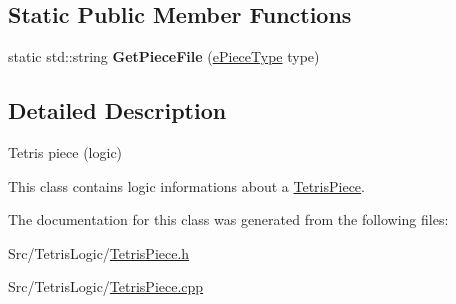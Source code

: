 \subsection*{Static Public Member Functions}
\begin{DoxyCompactItemize}
\item 
\hypertarget{classTetrisPiece_afd67ad033b0bb1ab9212e57cbc27eec5}{static std\-::string {\bfseries Get\-Piece\-File} (\hyperlink{TetrisGfxBlock_8h_a2592cbf66d668df0e31fa8d0d8a174de}{e\-Piece\-Type} type)}\label{classTetrisPiece_afd67ad033b0bb1ab9212e57cbc27eec5}

\end{DoxyCompactItemize}


\subsection{Detailed Description}
Tetris piece (logic) 

This class contains logic informations about a \hyperlink{classTetrisPiece}{Tetris\-Piece}. 

The documentation for this class was generated from the following files\-:\begin{DoxyCompactItemize}
\item 
Src/\-Tetris\-Logic/\hyperlink{TetrisPiece_8h}{Tetris\-Piece.\-h}\item 
Src/\-Tetris\-Logic/\hyperlink{TetrisPiece_8cpp}{Tetris\-Piece.\-cpp}\end{DoxyCompactItemize}
